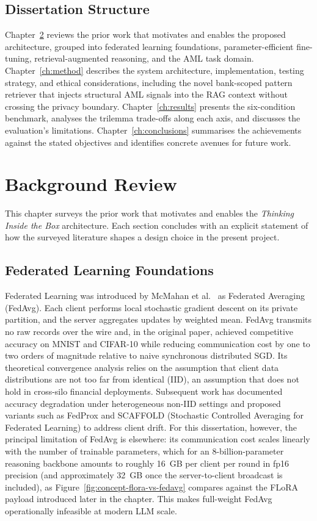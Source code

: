 \documentclass{report}
\begin{document}
\section{Dissertation Structure}

Chapter~\ref{ch:background} reviews the prior work that motivates and enables the proposed architecture, grouped into federated learning foundations, parameter-efficient fine-tuning, retrieval-augmented reasoning, and the AML task domain. Chapter~\ref{ch:method} describes the system architecture, implementation, testing strategy, and ethical considerations, including the novel bank-scoped pattern retriever that injects structural AML signals into the RAG context without crossing the privacy boundary. Chapter~\ref{ch:results} presents the six-condition benchmark, analyses the trilemma trade-offs along each axis, and discusses the evaluation's limitations. Chapter~\ref{ch:conclusions} summarises the achievements against the stated objectives and identifies concrete avenues for future work.


\chapter{Background Review}
\label{ch:background}

This chapter surveys the prior work that motivates and enables the \textit{Thinking Inside the Box} architecture. Each section concludes with an explicit statement of how the surveyed literature shapes a design choice in the present project.

\section{Federated Learning Foundations}
\label{sec:bg:fl}

Federated Learning was introduced by McMahan et al.~\cite{mcmahan2017communication} as Federated Averaging (FedAvg). Each client performs local stochastic gradient descent on its private partition, and the server aggregates updates by weighted mean. FedAvg transmits no raw records over the wire and, in the original paper, achieved competitive accuracy on MNIST and CIFAR-10 while reducing communication cost by one to two orders of magnitude relative to naive synchronous distributed SGD. Its theoretical convergence analysis relies on the assumption that client data distributions are not too far from identical (IID), an assumption that does not hold in cross-silo financial deployments. Subsequent work has documented accuracy degradation under heterogeneous non-IID settings and proposed variants such as FedProx and SCAFFOLD (Stochastic Controlled Averaging for Federated Learning) to address client drift. For this dissertation, however, the principal limitation of FedAvg is elsewhere: its communication cost scales linearly with the number of trainable parameters, which for an 8-billion-parameter reasoning backbone amounts to roughly 16~GB per client per round in fp16 precision (and approximately 32~GB once the server-to-client broadcast is included), as Figure~\ref{fig:concept-flora-vs-fedavg} compares against the FLoRA payload introduced later in the chapter. This makes full-weight FedAvg operationally infeasible at modern LLM scale.
\end{document}
